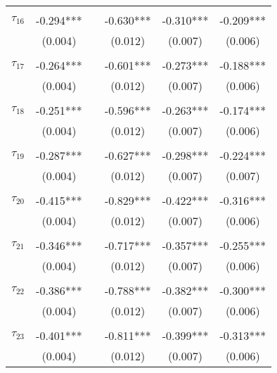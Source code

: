 \begin{tabular}{@{\extracolsep{-5pt}}lccccc}
                &           &&           &           &           \\[-2.1ex]
$\tau_{16}$     & -0.294*** && -0.630*** & -0.310*** & -0.209*** \\
                &  (0.004)  &&  (0.012)  &  (0.007)  &  (0.006)  \\
                &           &&           &           &           \\[-2.1ex]
$\tau_{17}$     & -0.264*** && -0.601*** & -0.273*** & -0.188*** \\
                &  (0.004)  &&  (0.012)  &  (0.007)  &  (0.006)  \\
                &           &&           &           &           \\[-2.1ex]
$\tau_{18}$     & -0.251*** && -0.596*** & -0.263*** & -0.174*** \\
                &  (0.004)  &&  (0.012)  &  (0.007)  &  (0.006)  \\
                &           &&           &           &           \\[-2.1ex]
$\tau_{19}$     & -0.287*** && -0.627*** & -0.298*** & -0.224*** \\
                &  (0.004)  &&  (0.012)  &  (0.007)  &  (0.007)  \\
                &           &&           &           &           \\[-2.1ex]
$\tau_{20}$     & -0.415*** && -0.829*** & -0.422*** & -0.316*** \\
                &  (0.004)  &&  (0.012)  &  (0.007)  &  (0.006)  \\
                &           &&           &           &           \\[-2.1ex]
$\tau_{21}$     & -0.346*** && -0.717*** & -0.357*** & -0.255*** \\
                &  (0.004)  &&  (0.012)  &  (0.007)  &  (0.006)  \\
                &           &&           &           &           \\[-2.1ex]
$\tau_{22}$     & -0.386*** && -0.788*** & -0.382*** & -0.300*** \\
                &  (0.004)  &&  (0.012)  &  (0.007)  &  (0.006)  \\
                &           &&           &           &           \\[-2.1ex]
$\tau_{23}$     & -0.401*** && -0.811*** & -0.399*** & -0.313*** \\
                &  (0.004)  &&  (0.012)  &  (0.007)  &  (0.006)  \\

\end{tabular}

